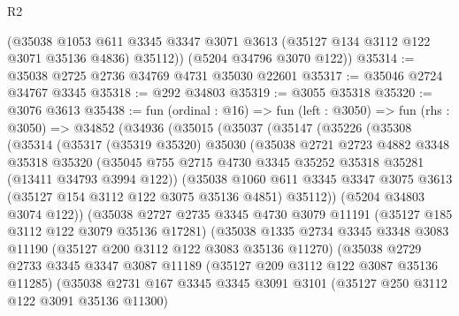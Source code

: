 \begin{lexlean}{R2}
\begin{coremodule}
        (@35038
          @1053
          @611
          @3345
          @3347
          @3071
          @3613
          (@35127 @134 @3112 @122 @3071 @35136 @4836)
          @35112))
      (@5204 @34796 @3070 @122))
@35314 := @35038 @2725 @2736 @34769 @4731 @35030 @22601
@35317 := @35046 @2724 @34767 @3345
@35318 := @292 @34803
@35319 := @3055 @35318
@35320 := @3076 @3613
@35438 := fun (ordinal : @16) =>
  fun (left : @3050) =>
  fun (rhs : @3050) =>
  @34852
    (@34936
      (@35015
        (@35037
          (@35147
            (@35226
              (@35308
                (@35314
                  (@35317
                    (@35319 @35320)
                    @35030
                    (@35038
                      @2721
                      @2723
                      @4882
                      @3348
                      @35318
                      @35320
                      (@35045
                        @755
                        @2715
                        @4730
                        @3345
                        @35252
                        @35318
                        @35281
                        (@13411 @34793 @3994 @122))
                      (@35038
                        @1060
                        @611
                        @3345
                        @3347
                        @3075
                        @3613
                        (@35127 @154 @3112 @122 @3075 @35136 @4851)
                        @35112))
                    (@5204 @34803 @3074 @122))
                  (@35038
                    @2727
                    @2735
                    @3345
                    @4730
                    @3079
                    @11191
                    (@35127 @185 @3112 @122 @3079 @35136 @17281)
                    (@35038
                      @1335
                      @2734
                      @3345
                      @3348
                      @3083
                      @11190
                      (@35127 @200 @3112 @122 @3083 @35136 @11270)
                      (@35038
                        @2729
                        @2733
                        @3345
                        @3347
                        @3087
                        @11189
                        (@35127 @209 @3112 @122 @3087 @35136 @11285)
                        (@35038
                          @2731
                          @167
                          @3345
                          @3345
                          @3091
                          @3101
                          (@35127 @250 @3112 @122 @3091 @35136 @11300)

\end{coremodule}
\end{lexlean}
